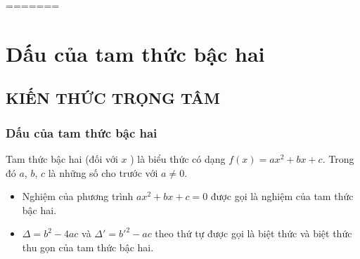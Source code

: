 =======
\setcounter{dang}{0}%
\setcounter{section}{2}
\section{Dấu của tam thức bậc hai}
\subsection{KIẾN THỨC TRỌNG TÂM}
\subsubsection{Dấu của tam thức bậc hai}
\begin{dn}
	Tam thức bậc hai (đối với $x$ ) là biểu thức có dạng $f(x)=ax^2+bx+c$. Trong đó $a$, $b$, $c$ là những số cho trước với $a\ne 0$.
\end{dn}
\begin{note}
	\begin{itemize}
		\item Nghiệm của phương trình $ax^2+bx+c=0$ được gọi là nghiệm của tam thức bậc hai.
		\item $ \Delta =b^2-4ac$ và $ \Delta '=b'^2-ac$ theo thứ tự được gọi là biệt thức và biệt thức thu gọn của tam thức bậc hai.
	\end{itemize}
\end{note}

